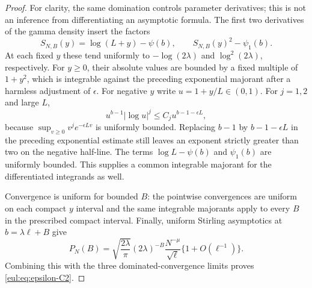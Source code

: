 \begin{proof}
For clarity, the same domination controls parameter derivatives;
this is not an inference from differentiating an asymptotic formula.
The first two derivatives of the gamma density insert the factors
\[
 S_{N,B}(y)=\log(L+y)-\psi(b),\qquad
 S_{N,B}(y)^2-\psi_1(b).
\]
At each fixed $y$ these tend uniformly to $-\log(2\lambda)$ and
$\log^2(2\lambda)$, respectively.
For $y\geq0$, their absolute values are bounded by a fixed multiple
of $1+y^2$, which is integrable against the preceding exponential
majorant after a harmless adjustment of $\epsilon$.
For negative $y$ write $u=1+y/L\in(0,1)$.
For $j=1,2$ and large $L$,
\[
 u^{b-1}|\log u|^j\leq C_j u^{b-1-\epsilon L},
\]
because $\sup_{v\geq0}v^j e^{-\epsilon L v}$ is uniformly bounded.
Replacing $b-1$ by $b-1-\epsilon L$ in the preceding exponential
estimate still leaves an exponent strictly greater than two on the
negative half-line.  The terms $\log L-\psi(b)$ and $\psi_1(b)$
are uniformly bounded.  This supplies a common integrable majorant
for the differentiated integrands as well.

Convergence is uniform for bounded $B$: the pointwise convergences
are uniform on each compact $y$ interval and the same integrable
majorants apply to every $B$ in the prescribed compact interval.
Finally, uniform Stirling asymptotics \cite{DLMFGamma} at $b=\lambda\ell+B$ give
\begin{equation}\label{eul:eq:gamma-window-density}
 P_N(B)=\sqrt{\frac{2\lambda}{\pi}}(2\lambda)^{-B}
           \frac{N^{-\mu}}{\sqrt\ell}\{1+O(\ell^{-1})\}.
\end{equation}
Combining this with the three dominated-convergence limits proves
\eqref{eul:eq:epsilon-C2}.
\end{proof}

